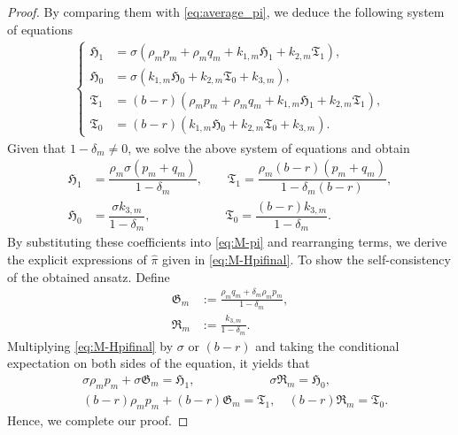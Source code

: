 \documentclass[10pt,a4paper]{amsart}
\begin{document}
\begin{proof}
By comparing them with \eqref{eq:average_pi}, we deduce the following system of equations
\begin{align}
\begin{cases}
\mathfrak{H}_1&=\sigma\left(\rho_{\scriptscriptstyle m}p_{\scriptscriptstyle m}+\rho_{\scriptscriptstyle m} q_{\scriptscriptstyle m} +k_{1,\scriptscriptstyle m}\mathfrak{H}_1+k_{2,\scriptscriptstyle m}\mathfrak{T}_1\right),\\
\mathfrak{H}_0&=\sigma \left(k_{1,\scriptscriptstyle m}\mathfrak{H}_0+k_{2,\scriptscriptstyle m}\mathfrak{T}_0+k_{3,\scriptscriptstyle m}\right),\\
\mathfrak{T}_1&=(b-r)\left(\rho_{\scriptscriptstyle m}p_{\scriptscriptstyle m}+\rho_{\scriptscriptstyle m} q_{\scriptscriptstyle m} +k_{1,m}\mathfrak{H}_1+k_{2,m}\mathfrak{T}_1\right),\\
\mathfrak{T}_0&=(b-r) \left(k_{1,\scriptscriptstyle m}\mathfrak{H}_0+k_{2,\scriptscriptstyle m}\mathfrak{T}_0+k_{3,m}\right).
\end{cases}
\end{align}
Given that $1-\delta_{\scriptscriptstyle m}\neq 0$, we solve the above system of equations and obtain
	\begin{equation}
		\begin{aligned}
			\mathfrak{H}_1&=\dfrac{\rho_{\scriptscriptstyle m} \sigma (p_{\scriptscriptstyle m}+q_{\scriptscriptstyle m})}{1 - \delta_m},\qquad
			\mathfrak{T}_1=\dfrac{\rho_{\scriptscriptstyle m}(b-r)(p_{\scriptscriptstyle m}+q_{\scriptscriptstyle m})}{1-\delta_m (b-r)},\\
			\mathfrak{H}_0&= \dfrac{\sigma k_{3,\scriptscriptstyle m}}{1-\delta_m}, \qquad \qquad \qquad
			\mathfrak{T}_0=\dfrac{(b-r) k_{3,\scriptscriptstyle m}}{1-\delta_m}.
		\end{aligned}
	\end{equation}
	By substituting these coefficients into \eqref{eq:M-pi} and rearranging terms, we derive the explicit expressions of $\widehat{\pi}$ given in \eqref{eq:M-Hpifinal}.
To show the self-consistency of the obtained ansatz. Define
	\begin{align*}
		\mathfrak{G}_{\scriptscriptstyle m}&:=\frac{\rho_{\scriptscriptstyle m}q_{\scriptscriptstyle m}+\delta_{\scriptscriptstyle m}\rho_{\scriptscriptstyle m} p_{\scriptscriptstyle m}}{1-\delta_{\scriptscriptstyle m}},\\
		\mathfrak{R}_{\scriptscriptstyle m}&:=\frac{k_{3,m}}{1-\delta_{\scriptscriptstyle m}}.
	\end{align*}
	Multiplying \eqref{eq:M-Hpifinal} by $\sigma$ or $(b-r)$ and taking the conditional expectation on both sides of the equation, it yields that
	\begin{align*}
		&\sigma \rho_{\scriptscriptstyle m} p_{\scriptscriptstyle m}+  \sigma\mathfrak{G}_{\scriptscriptstyle m}=\mathfrak{H}_1,\qquad \qquad \qquad\sigma \mathfrak{R}_{\scriptscriptstyle m}=\mathfrak{H}_0,\\
&(b-r) \rho_{\scriptscriptstyle m} p_{\scriptscriptstyle m}+  (b-r)\mathfrak{G}_{\scriptscriptstyle m}=\mathfrak{T}_1,\quad (b-r) \mathfrak{R}_{\scriptscriptstyle m}=\mathfrak{T}_0.
	\end{align*}
Hence, we complete our proof.
\end{proof}
\end{document}
